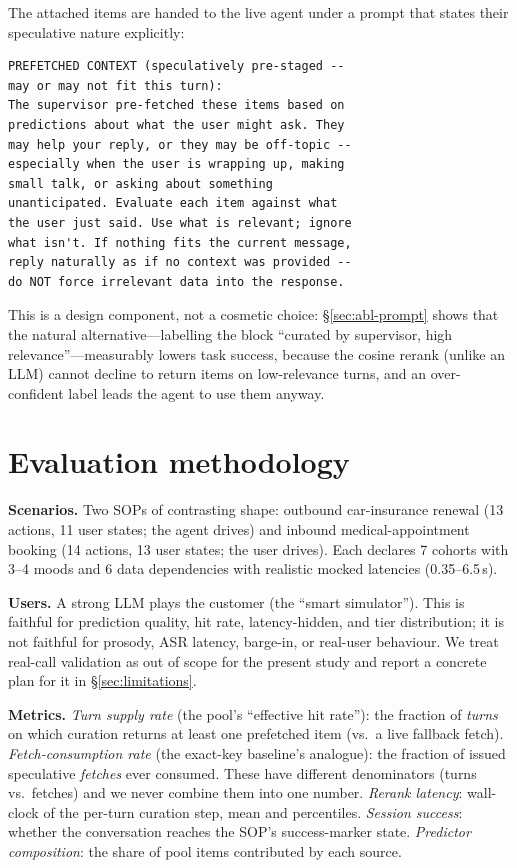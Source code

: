 \documentclass[10pt,twocolumn]{article}
\begin{document}
The attached items are handed to the live agent under a prompt that states their speculative nature explicitly:

{\footnotesize\begin{verbatim}
PREFETCHED CONTEXT (speculatively pre-staged --
may or may not fit this turn):
The supervisor pre-fetched these items based on
predictions about what the user might ask. They
may help your reply, or they may be off-topic --
especially when the user is wrapping up, making
small talk, or asking about something
unanticipated. Evaluate each item against what
the user just said. Use what is relevant; ignore
what isn't. If nothing fits the current message,
reply naturally as if no context was provided --
do NOT force irrelevant data into the response.
\end{verbatim}}

\noindent This is a design component, not a cosmetic choice: \S\ref{sec:abl-prompt} shows that the natural alternative---labelling the block ``curated by supervisor, high relevance''---measurably lowers task success, because the cosine rerank (unlike an LLM) cannot decline to return items on low-relevance turns, and an over-confident label leads the agent to use them anyway.

\section{Evaluation methodology}
\label{sec:method}

\textbf{Scenarios.} Two SOPs of contrasting shape: outbound car-insurance renewal (13 actions, 11 user states; the agent drives) and inbound medical-appointment booking (14 actions, 13 user states; the user drives). Each declares 7 cohorts with 3--4 moods and 6 data dependencies with realistic mocked latencies (0.35--6.5\,s).

\textbf{Users.} A strong LLM plays the customer (the ``smart simulator''). This is faithful for prediction quality, hit rate, latency-hidden, and tier distribution; it is not faithful for prosody, ASR latency, barge-in, or real-user behaviour. We treat real-call validation as out of scope for the present study and report a concrete plan for it in \S\ref{sec:limitations}.

\textbf{Metrics.} \emph{Turn supply rate} (the pool's ``effective hit rate''): the fraction of \emph{turns} on which curation returns at least one prefetched item (vs.\ a live fallback fetch). \emph{Fetch-consumption rate} (the exact-key baseline's analogue): the fraction of issued speculative \emph{fetches} ever consumed. These have different denominators (turns vs.\ fetches) and we never combine them into one number. \emph{Rerank latency}: wall-clock of the per-turn curation step, mean and percentiles. \emph{Session success}: whether the conversation reaches the SOP's success-marker state. \emph{Predictor composition}: the share of pool items contributed by each source.
\end{document}
